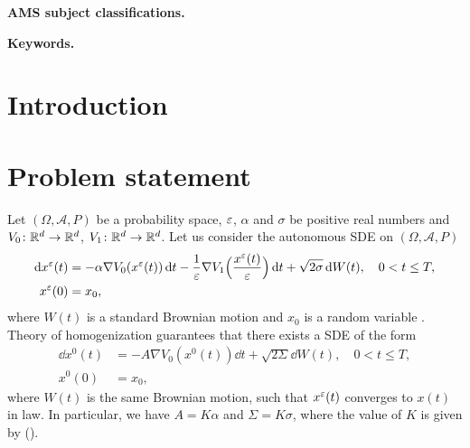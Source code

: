 \documentclass[10pt]{article}
\begin{document}
\maketitle	

\begin{abstract}
\end{abstract}

\textbf{AMS subject classifications.} 

\textbf{Keywords.} 

\normalsize
\section{Introduction}

\section{Problem statement}

Let $(\Omega, \mathcal A, P)$ be a probability space, $\varepsilon$, $\alpha$ and $\sigma$ be positive real numbers and $V_0 \colon \mathbb{R}^d \to \mathbb{R}^d$, $V_1 \colon \mathbb{R}^d \to \mathbb{R}^d$. Let us consider the autonomous SDE on $(\Omega, \mathcal A, P)$
\begin{equation}\label{eq:SDE_MS}
\begin{aligned}
	\mathrm{d} x^\varepsilon(t) &= -\alpha \nabla V_0(x^\varepsilon(t)) \,\mathrm{d} t - \frac{1}{\varepsilon}\nabla V_1\Big(\frac{x^\varepsilon(t)}{\varepsilon}\Big) \,\mathrm{d} t + \sqrt{2\sigma} \,\mathrm{d} W(t), \quad 0 < t \leq T, \\
	x^\varepsilon(0) &= x_0,
\end{aligned}
\end{equation}
where $W(t)$ is a standard Brownian motion and $x_0$ is a random variable . Theory of homogenization guarantees that there exists a SDE of the form
\begin{equation}\label{eq:SDE_HOM}
\begin{aligned}
	\dd x^0(t) &= -A \nabla V_0(x^0(t)) \dd t + \sqrt{2\Sigma} \dd W(t), \quad 0 < t \leq T, \\
	x^0(0) &= x_0,
\end{aligned}
\end{equation}
where $W(t)$ is the same Brownian motion, such that $x^\varepsilon(t)$ converges to $x(t)$ in law. In particular, we have $A = K\alpha$ and $\Sigma = K\sigma$, where the value of $K$ is given by ().
\end{document}
